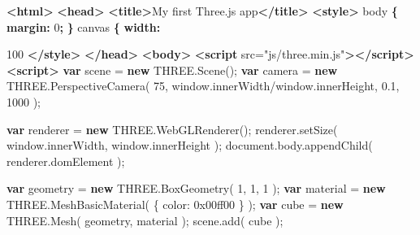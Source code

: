 \documentclass[]{article}
\newenvironment{Shaded}{}{}
\newcommand{\KeywordTok}[1]{\textcolor[rgb]{0.00,0.44,0.13}{\textbf{{#1}}}}
\newcommand{\DataTypeTok}[1]{\textcolor[rgb]{0.56,0.13,0.00}{{#1}}}
\newcommand{\DecValTok}[1]{\textcolor[rgb]{0.25,0.63,0.44}{{#1}}}
\newcommand{\BaseNTok}[1]{\textcolor[rgb]{0.25,0.63,0.44}{{#1}}}
\newcommand{\FloatTok}[1]{\textcolor[rgb]{0.25,0.63,0.44}{{#1}}}
\newcommand{\StringTok}[1]{\textcolor[rgb]{0.25,0.44,0.63}{{#1}}}
\newcommand{\OtherTok}[1]{\textcolor[rgb]{0.00,0.44,0.13}{{#1}}}
\newcommand{\FunctionTok}[1]{\textcolor[rgb]{0.02,0.16,0.49}{{#1}}}
\newcommand{\NormalTok}[1]{{#1}}
\begin{document}
\begin{Shaded}
\begin{Highlighting}[]
\KeywordTok{<html>}
    \KeywordTok{<head>}
        \KeywordTok{<title>}\NormalTok{My first Three.js app}\KeywordTok{</title>}
        \KeywordTok{<style>}
            \NormalTok{body }\KeywordTok{\{} \KeywordTok{margin:} \DataTypeTok{0}\KeywordTok{;} \KeywordTok{\}}
            \NormalTok{canvas }\KeywordTok{\{} \KeywordTok{width:} \DataTypeTok{100%
        \KeywordTok{</style>}
    \KeywordTok{</head>}
    \KeywordTok{<body>}
        \KeywordTok{<script}\OtherTok{ src=}\StringTok{"js/three.min.js"}\KeywordTok{></script>}
        \KeywordTok{<script>}
            \KeywordTok{var} \NormalTok{scene = }\KeywordTok{new} \OtherTok{THREE}\NormalTok{.}\FunctionTok{Scene}\NormalTok{();}
            \KeywordTok{var} \NormalTok{camera = }\KeywordTok{new} \OtherTok{THREE}\NormalTok{.}\FunctionTok{PerspectiveCamera}\NormalTok{( }\DecValTok{75}\NormalTok{,}
                             \OtherTok{window}\NormalTok{.}\FunctionTok{innerWidth}\NormalTok{/}\OtherTok{window}\NormalTok{.}\FunctionTok{innerHeight}\NormalTok{, }\FloatTok{0.1}\NormalTok{, }\DecValTok{1000} \NormalTok{);}

            \KeywordTok{var} \NormalTok{renderer = }\KeywordTok{new} \OtherTok{THREE}\NormalTok{.}\FunctionTok{WebGLRenderer}\NormalTok{();}
            \OtherTok{renderer}\NormalTok{.}\FunctionTok{setSize}\NormalTok{( }\OtherTok{window}\NormalTok{.}\FunctionTok{innerWidth}\NormalTok{, }\OtherTok{window}\NormalTok{.}\FunctionTok{innerHeight} \NormalTok{);}
            \OtherTok{document}\NormalTok{.}\OtherTok{body}\NormalTok{.}\FunctionTok{appendChild}\NormalTok{( }\OtherTok{renderer}\NormalTok{.}\FunctionTok{domElement} \NormalTok{);}

            \KeywordTok{var} \NormalTok{geometry = }\KeywordTok{new} \OtherTok{THREE}\NormalTok{.}\FunctionTok{BoxGeometry}\NormalTok{( }\DecValTok{1}\NormalTok{, }\DecValTok{1}\NormalTok{, }\DecValTok{1} \NormalTok{);}
            \KeywordTok{var} \NormalTok{material = }\KeywordTok{new} \OtherTok{THREE}\NormalTok{.}\FunctionTok{MeshBasicMaterial}\NormalTok{( \{ }\DataTypeTok{color}\NormalTok{: }\BaseNTok{0x00ff00} \NormalTok{\} );}
            \KeywordTok{var} \NormalTok{cube = }\KeywordTok{new} \OtherTok{THREE}\NormalTok{.}\FunctionTok{Mesh}\NormalTok{( geometry, material );}
            \OtherTok{scene}\NormalTok{.}\FunctionTok{add}\NormalTok{( cube );}

}
\end{Highlighting}
\end{Shaded}
\end{document}
